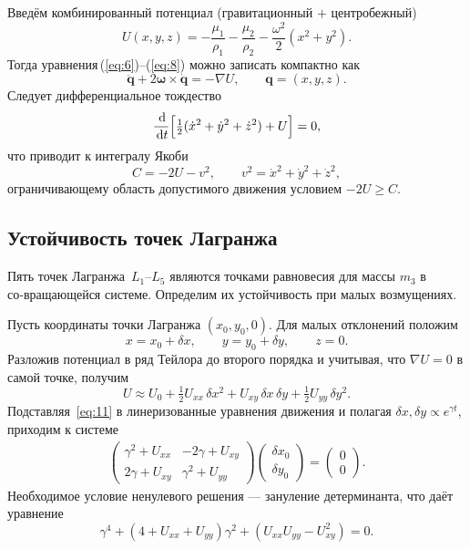 \documentclass[12pt]{article}
\newcommand{\omegav}{\boldsymbol{\omega}}
\newcommand{\muone}{\mu_1}
\newcommand{\mutwo}{\mu_2}
\newcommand{\dd}{\,\mathrm d}
\begin{document}
Введём комбинированный потенциал (гравитационный $+$ центробежный)
\begin{equation}\label{eq:9}
  U(x,y,z) = -\frac{\muone}{\rho_1}-\frac{\mutwo}{\rho_2}-\frac{\omega^{2}}{2}(x^{2}+y^{2}).
\end{equation}
Тогда уравнения\,(\ref{eq:6})–(\ref{eq:8}) можно записать компактно как
\begin{equation}
  \ddot {\mathbf q} + 2\omegav\times\dot{\mathbf q} = -\nabla U,\qquad \mathbf q=(x,y,z).
\end{equation}
Следует дифференциальное тождество
\begin{equation}\label{eq:10}
  \frac{\dd}{\dd t}\Bigl[\tfrac12(\dot x^{2}+\dot y^{2}+\dot z^{2})+U\Bigr]=0,
\end{equation}
что приводит к интегралу Якоби
\begin{equation}
  C = -2U-v^{2},\qquad v^{2}=\dot x^{2}+\dot y^{2}+\dot z^{2},
\end{equation}
ограничивающему область допустимого движения условием $-2U\ge C$. \par
\bigskip

\subsection{Устойчивость точек Лагранжа}\label{sec:stability}

Пять точек Лагранжа~$L_1$–$L_5$ являются точками равновесия для массы $m_3$ в со‑вращающейся системе. Определим их устойчивость при малых возмущениях.

Пусть координаты точки Лагранжа $(x_0,y_0,0)$. Для малых отклонений положим
\begin{equation}
  x=x_0+\delta x,\qquad y=y_0+\delta y,\qquad z=0.
\end{equation}
Разложив потенциал в ряд Тейлора до второго порядка и учитывая, что $\nabla U=0$ в самой точке, получим
\begin{equation}\label{eq:11}
  U\approx U_0+\tfrac12 U_{xx}\,\delta x^{2}+U_{xy}\,\delta x\,\delta y+\tfrac12 U_{yy}\,\delta y^{2}.
\end{equation}
Подставляя~\eqref{eq:11} в линеризованные уравнения движения и полагая $\delta x,\delta y\propto e^{\gamma t}$, приходим к системе
\begin{align}\label{eq:12}
  \begin{pmatrix}
    \gamma^{2}+U_{xx} & -2\gamma+U_{xy}\\[4pt]
    2\gamma+U_{xy} & \gamma^{2}+U_{yy}
  \end{pmatrix}
  \begin{pmatrix}\delta x_0\\ \delta y_0\end{pmatrix}=\begin{pmatrix}0\\0\end{pmatrix}.
\end{align}
Необходимое условие ненулевого решения — зануление детерминанта, что даёт уравнение
\begin{equation}\label{eq:13}
  \gamma^{4}+(4+U_{xx}+U_{yy})\gamma^{2}+(U_{xx}U_{yy}-U_{xy}^{2})=0.
\end{equation}
\end{document}
